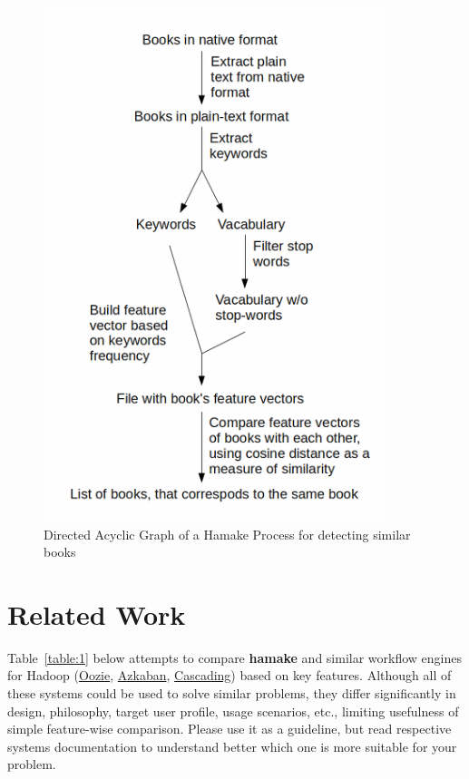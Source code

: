 \documentclass[11pt,twocolumn]{article}
\begin{document}
\begin{figure}[htp]
\centering
\includegraphics[width=10cm]{SimilarityAlgDAG.png}
\caption{Directed Acyclic Graph of a Hamake Process for detecting similar books}
\label{fig:SimilarityAlgDAG}
\end{figure}

\section{Related Work}

Table~\ref{table:1} below attempts to compare \textbf{hamake} and
similar workflow engines for Hadoop
(\href{http://github.com/tucu00/oozie1}{Oozie},
\href{http://sna-projects.com/azkaban/}{Azkaban},
\href{http://www.cascading.org/}{Cascading}) based on key
features. Although all of these systems could be used to solve similar
problems, they differ significantly in design, philosophy, target user
profile, usage scenarios, etc., limiting usefulness of simple
feature-wise comparison. Please use it as a guideline, but read
respective systems documentation to understand better which one is
more suitable for your problem.
\end{document}
